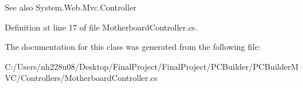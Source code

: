 \begin{DoxySeeAlso}{See also}
System.\+Web.\+Mvc.\+Controller


\end{DoxySeeAlso}


Definition at line 17 of file Motherboard\+Controller.\+cs.



The documentation for this class was generated from the following file\+:\begin{DoxyCompactItemize}
\item 
C\+:/\+Users/nh228u08/\+Desktop/\+Final\+Project/\+Final\+Project/\+P\+C\+Builder/\+P\+C\+Builder\+M\+V\+C/\+Controllers/Motherboard\+Controller.\+cs\end{DoxyCompactItemize}
